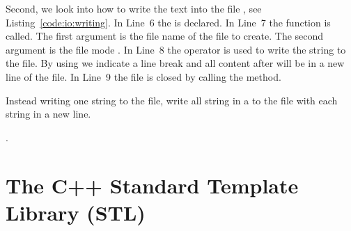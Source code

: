 Second, we look into how to write the text  into the file , see Listing~\ref{code:io:writing}. In Line~6 the  is declared. In Line~7 the function  is called. The first argument is the file name of the file to create. The second argument is the file mode . In Line~8 the operator \cpp{<<} is used to write the string to the file. By using  we indicate a line break and all content after will be in a new line of the file. In Line~9 the file is closed by calling the  method.

\begin{exercise}
Instead writing one string to the file, write all string in a  to the file with each string in a new line.
\end{exercise}

. 


\newpage
\theendnotes

\chapter{The C++ Standard Template Library (STL)}
\label{chapter:stl}

